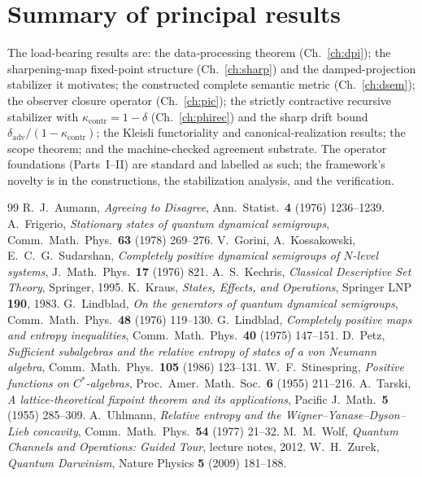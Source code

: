 \documentclass[11pt]{report}
\theoremstyle{plain}
\theoremstyle{definition}
\theoremstyle{remark}
\newcommand{\kcontr}{\kappa_{\mathrm{contr}}}
\begin{document}
\chapter{Summary of principal results}
The load-bearing results are: the data-processing theorem (Ch.~\ref{ch:dpi}); the
sharpening-map fixed-point structure (Ch.~\ref{ch:sharp}) and the damped-projection
stabilizer it motivates; the constructed complete semantic metric (Ch.~\ref{ch:dsem});
the observer closure operator (Ch.~\ref{ch:pic}); the strictly contractive recursive
stabilizer with $\kcontr=1-\delta$ (Ch.~\ref{ch:phirec}) and the sharp drift bound
$\delta_{\mathrm{adv}}/(1-\kcontr)$; the Kleisli functoriality and canonical-realization
results; the scope theorem; and the machine-checked agreement substrate. The operator
foundations (Parts~I--II) are standard and labelled as such; the framework's novelty is
in the constructions, the stabilization analysis, and the verification.

\begin{thebibliography}{99}
 R.~J.~Aumann, \emph{Agreeing to Disagree}, Ann.\ Statist.\ \textbf{4}
(1976) 1236--1239.
 A.~Frigerio, \emph{Stationary states of quantum dynamical semigroups},
Comm.\ Math.\ Phys.\ \textbf{63} (1978) 269--276.
 V.~Gorini, A.~Kossakowski, E.~C.~G.~Sudarshan, \emph{Completely positive
dynamical semigroups of $N$-level systems}, J.\ Math.\ Phys.\ \textbf{17} (1976) 821.
 A.~S.~Kechris, \emph{Classical Descriptive Set Theory}, Springer, 1995.
 K.~Kraus, \emph{States, Effects, and Operations}, Springer LNP \textbf{190},
1983.
 G.~Lindblad, \emph{On the generators of quantum dynamical
semigroups}, Comm.\ Math.\ Phys.\ \textbf{48} (1976) 119--130.
 G.~Lindblad, \emph{Completely positive maps and entropy
inequalities}, Comm.\ Math.\ Phys.\ \textbf{40} (1975) 147--151.
 D.~Petz, \emph{Sufficient subalgebras and the relative entropy of states
of a von Neumann algebra}, Comm.\ Math.\ Phys.\ \textbf{105} (1986) 123--131.
 W.~F.~Stinespring, \emph{Positive functions on $C^\ast$-algebras},
Proc.\ Amer.\ Math.\ Soc.\ \textbf{6} (1955) 211--216.
 A.~Tarski, \emph{A lattice-theoretical fixpoint theorem and its
applications}, Pacific J.\ Math.\ \textbf{5} (1955) 285--309.
 A.~Uhlmann, \emph{Relative entropy and the
Wigner--Yanase--Dyson--Lieb concavity}, Comm.\ Math.\ Phys.\ \textbf{54} (1977) 21--32.
 M.~M.~Wolf, \emph{Quantum Channels and Operations: Guided Tour}, lecture
notes, 2012.
 W.~H.~Zurek, \emph{Quantum Darwinism}, Nature Physics \textbf{5} (2009)
181--188.
\end{thebibliography}
\end{document}
